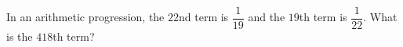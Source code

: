 In an arithmetic progression, the $22$nd term is $\dfrac{1}{19}$ and the $19$th term is $\dfrac{1}{22}$. What is the $418$th term?
